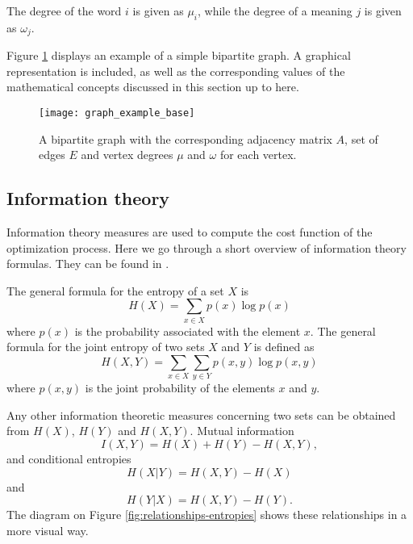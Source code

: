 The degree of the word $i$ is given as $\mu_i$, while the degree of a meaning $j$ is given as $\omega_j$.

Figure \ref{fig:graph-example-base} displays an example of a simple bipartite graph.
A graphical representation is included, as well as the corresponding values of the mathematical concepts discussed in this section up to here.

\begin{figure}
  \centering
  \texttt{[image: graph\_example\_base]}
  \caption{%
    A bipartite graph with the corresponding adjacency matrix $A$, set of edges $E$ and vertex degrees $\mu$ and $\omega$ for each vertex.
  }
  \label{fig:graph-example-base}
\end{figure}

\subsection{Information theory}
\label{sec:introduction_model_info-theory}

Information theory measures are used to compute the cost function of the optimization process.
Here we go through a short overview of information theory formulas. They can be found in \cite{Cover1999}.

The general formula for the entropy of a set $X$ is
\begin{equation}
  \label{eq:definition-entropy-generic}
  H(X) = \sum_{x \in X} p(x) \log p(x)
\end{equation}
where $p(x)$ is the probability associated with the element $x$.
The general formula for the joint entropy of two sets $X$ and $Y$ is defined as
\begin{equation}
  \label{eq:definition-joint-entropy-generic}
  H(X,Y) = \sum_{x \in X} \sum_{y \in Y} p(x,y) \log p(x,y)
\end{equation}
where $p(x,y)$ is the joint probability of the elements $x$ and $y$.

Any other information theoretic measures concerning two sets can be obtained from $H(X)$, $H(Y)$ and $H(X,Y)$.
Mutual information
\begin{equation*}
  I(X,Y) = H(X) + H(Y) - H(X,Y),
\end{equation*}
and conditional entropies
\begin{equation*}
  H(X|Y) = H(X,Y) - H(X)
\end{equation*}
and
\begin{equation*}
  H(Y|X) = H(X,Y) - H(Y).
\end{equation*}
The diagram on Figure \ref{fig:relationships-entropies} shows these relationships in a more visual way.

